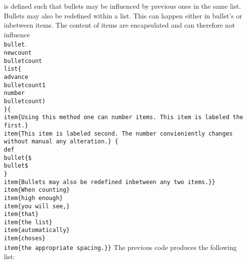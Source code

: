 \noindent{\tt\\bullet} is defined such that bullets may be influenced by previous ones in the same list. Bullets may also be redefined within a list. This can happen either in bullet's or inbetween items. The content of items are encapsulated and can therefore not influence {\tt\\bullet}.\hfil\break
{\tt\\newcount\\bulletcount\hfil\break
\\list\{\\advance\\bulletcount1 \\number\\bulletcount)\\ \}\{\hfil\break
\\item\{Using this method one can number items.\hfil\break
This item is labeled the first.\}\hfil\break
\\item\{This item is labeled second.\hfil\break
The number convieniently changes without manual any alteration.\}\hfil\break
\{\\def\\bullet\{\$\\bullet\$\\ \}\hfil\break
\\item\{Bullets may also be redefined inbetween any two items.\}\}\hfil\break
\\item\{When counting\}\hfil\break
\\item\{high enough\}\hfil\break
\\item\{you will see,\}\hfil\break
\\item\{that\}\hfil\break
\\item\{the list\}\hfil\break
\\item\{automatically\}\hfil\break
\\item\{choses\}\hfil\break
\\item\{the appropriate spacing.\}\}}\hfil\break
The previous code produces the following list:\hfil\break
\newcount\bulletcount
{}
